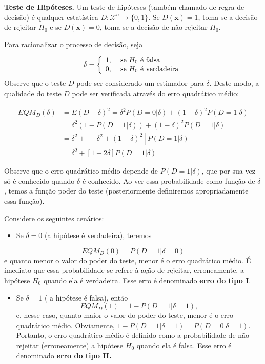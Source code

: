 \documentclass[
  letterpaper,
  DIV=11,
  numbers=noendperiod]{scrartcl}
\providecommand{\tightlist}{%
  \setlength{\itemsep}{0pt}\setlength{\parskip}{0pt}}\usepackage{longtable,booktabs,array}
\begin{document}
\textbf{Teste de Hipóteses.} Um teste de hipóteses (também chamado de
regra de decisão) é qualquer estatística
\(D:\mathcal{X}^n\rightarrow \{0,1\}\). Se \(D(\textbf{x})=1\), toma-se
a decisão de rejeitar \(H_0\) e se \(D(\textbf{x})=0\), toma-se a
decisão de não rejeitar \(H_0\).

Para racionalizar o processo de decisão, seja

\[\delta=\left\{\begin{array}{ll}1,& \hbox{ se $H_0$ é falsa }\\ 0,&\hbox{ se $H_0$ é verdadeira}\end{array}\right.\]
Observe que o teste \(D\) pode ser considerado um estimador para
\(\delta\). Deste modo, a qualidade do teste \(D\) pode ser verificada
através do erro quadrático médio:

\[\begin{align}EQM_{D}(\delta)&=E(D-\delta)^2=\delta^2P(D=0|\delta)+(1-\delta)^2P(D=1|\delta)\\
&= \delta^2(1-P(D=1|\delta))+(1-\delta)^2 P(D=1|\delta)\\
&=\delta^2+[-\delta^2+(1-\delta)^2]P(D=1|\delta)\\
&=\delta^2+[1-2\delta]P(D=1|\delta)\end{align}\]

Observe que o erro quadrático médio depende de \(P(D=1|\delta)\), que
por sua vez só é conhecido quando \(\delta\) é conhecido. Ao ver essa
probabilidade como função de \(\delta\), temos a função poder do teste
(posteriormente definiremos apropriadamente essa função).

Considere os seguintes cenários:

\begin{itemize}
\tightlist
\item
  Se \(\delta=0\) (a hipótese é verdadeira), teremos
\end{itemize}

\[EQM_D(0)=P(D=1|\delta=0)\] e quanto menor o valor do poder do teste,
menor é o erro quadrático médio. É imediato que essa probabilidade se
refere à ação de rejeitar, erroneamente, a hipótese \(H_0\) quando ela é
verdadeira. Esse erro é denominado \textbf{erro do tipo I}.

\begin{itemize}
\tightlist
\item
  Se \(\delta=1\) ( a hipótese é falsa), então
  \[EQM_D(1)=1-P(D=1|\delta=1),\] e, nesse caso, quanto maior o valor do
  poder do teste, menor é o erro quadrático médio. Obviamente,
  \(1-P(D=1|\delta=1)=P(D=0|\delta=1)\). Portanto, o erro quadrático
  médio é definido como a probabilidade de não rejeitar (erroneamente) a
  hipótese \(H_0\) quando ela é falsa. Esse erro é denominado
  \textbf{erro do tipo II.}
\end{itemize}
\end{document}
